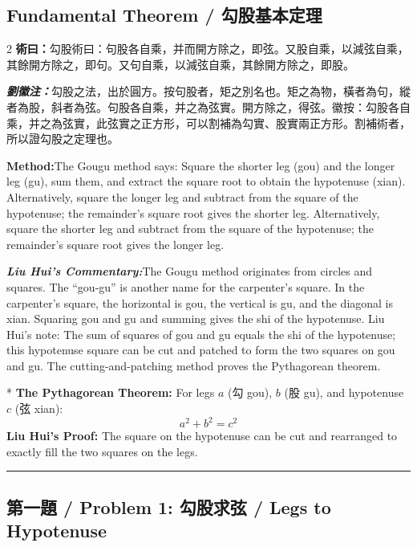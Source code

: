 \documentclass[11pt,a4paper]{article}
\newcommand{\cnshu}{\textcolor{cnlabelfg}{\textbf{術曰：}}}
\newcommand{\cnzhu}{\textcolor{commentarycolor}{\textit{\textbf{劉徽注：}}}}
\newcommand{\enshu}{\textcolor{enlabelfg}{\textbf{Method:}}}
\newcommand{\enzhu}{\textcolor{enlabelfg}{\textit{\textbf{Liu Hui's Commentary:}}}}
\newenvironment{mathdisplay}{\switchcolumn[0]*}{\switchcolumn[0]}
\begin{document}
\subsection*{Fundamental Theorem / 勾股基本定理}

\begin{paracol}{2}
\switchcolumn[0]
\cnshu 勾股術曰：句股各自乘，并而開方除之，即弦。又股自乘，以減弦自乘，其餘開方除之，即句。又句自乘，以減弦自乘，其餘開方除之，即股。

\cnzhu 勾股之法，出於圓方。按句股者，矩之別名也。矩之為物，橫者為句，縱者為股，斜者為弦。句股各自乘，并之為弦實。開方除之，得弦。徽按：勾股各自乘，并之為弦實，此弦實之正方形，可以割補為勾實、股實兩正方形。割補術者，所以證勾股之定理也。

\switchcolumn[1]
\enshu The Gougu method says: Square the shorter leg (gou) and the longer leg (gu), sum them, and extract the square root to obtain the hypotenuse (xian). Alternatively, square the longer leg and subtract from the square of the hypotenuse; the remainder's square root gives the shorter leg. Alternatively, square the shorter leg and subtract from the square of the hypotenuse; the remainder's square root gives the longer leg.

\enzhu The Gougu method originates from circles and squares. The ``gou-gu'' is another name for the carpenter's square. In the carpenter's square, the horizontal is gou, the vertical is gu, and the diagonal is xian. Squaring gou and gu and summing gives the shi of the hypotenuse. Liu Hui's note: The sum of squares of gou and gu equals the shi of the hypotenuse; this hypotenuse square can be cut and patched to form the two squares on gou and gu. The cutting-and-patching method proves the Pythagorean theorem.
\end{paracol}

\begin{mathdisplay}
\textbf{The Pythagorean Theorem:} For legs $a$ (勾 gou), $b$ (股 gu), and hypotenuse $c$ (弦 xian):
\[a^2 + b^2 = c^2\]
\textbf{Liu Hui's Proof:} The square on the hypotenuse can be cut and rearranged to exactly fill the two squares on the legs.
\end{mathdisplay}

\bigskip\hrule\bigskip

\subsection{第一題 / Problem 1: 勾股求弦 / Legs to Hypotenuse}
\end{document}
